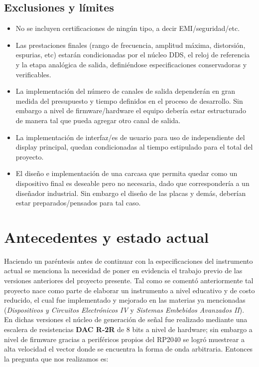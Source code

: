 \subsection{Exclusiones y límites}

\begin{itemize}
	\item No se incluyen certificaciones de ningún tipo, a decir EMI/seguridad/etc.
	
	\item Las prestaciones finales (rango de frecuencia, amplitud máxima, distorsión, espurias, etc) estarán condicionadas por el núcleo DDS, el reloj de referencia y la etapa analógica de salida, definiéndose especificaciones conservadoras y verificables.
	
	\item La implementación del número de canales de salida dependerán en gran medida del presupuesto y tiempo definidos en el proceso de desarrollo. Sin embargo a nivel de firmware/hardware el equipo debería estar estructurado de manera tal que pueda agregar otro canal de salida.
	
	\item La implementación de interfaz/es de usuario para uso de independiente del display principal, quedan condicionadas al tiempo estipulado para el total del proyecto.
	
	\item El diseño e implementación de una carcasa que permita quedar como un dispositivo final es deseable pero no necesaria, dado que correspondería a un diseñador industrial. Sin embargo el diseño de las placas y demás, deberían estar preparados/pensados para tal caso.
\end{itemize}

\section{Antecedentes y estado actual}
Haciendo un paréntesis antes de continuar con la especificaciones del instrumento actual se menciona la necesidad de poner en evidencia el trabajo previo de las versiones anteriores del proyecto presente. Tal como se comentó anteriormente tal proyecto nace como parte de elaborar un instrumento a nivel educativo y de costo reducido, el cual fue implementado y mejorado en las materias ya mencionadas (\textit{Dispositivos y Circuitos Electrónicos IV} y \textit{Sistemas Embebidos Avanzados II}). En dichas versiones el núcleo de generación de señal fue realizado mediante una escalera de resistencias \textbf{DAC R-2R} de 8 bits a nivel de hardware; sin embargo a nivel de firmware gracias a periféricos propios del RP2040 se logró muestrear a alta velocidad el vector donde se encuentra la forma de onda arbitraria. Entonces la pregunta que nos realizamos es:

